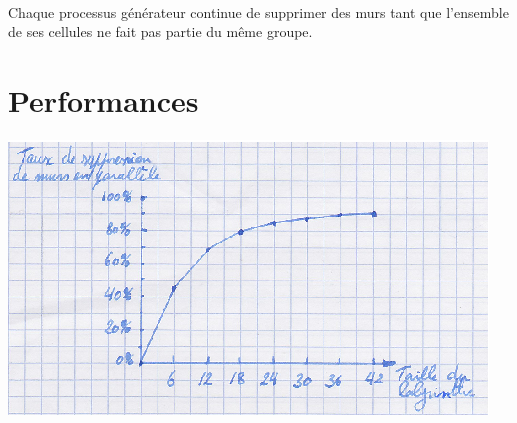 \documentclass[a4paper,french]{article}
\begin{document}
    \paragraph{} Chaque processus générateur continue de supprimer des murs tant
que l'ensemble de ses cellules ne fait pas partie du même groupe.

\section{Performances}

    \paragraph{} 

    \begin{center}
        \includegraphics{schema_performances.eps}
    \end{center}
\end{document}

